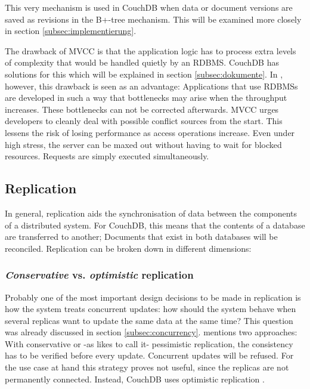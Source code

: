 This very mechanism is used in CouchDB when data or document versions are saved as revisions in the B+-tree mechanism. This will be examined more closely in section \ref{subsec:implementierung}.

The drawback of MVCC is that the application logic has to process extra levels of complexity that would be handled quietly by an RDBMS. CouchDB has solutions for this which will be explained in section \ref{subsec:dokumente}. In , however, this drawback is seen as an advantage: Applications that use RDBMSs are developed in such a way that bottlenecks may arise when the throughput increases. These bottlenecks can not be corrected afterwards. MVCC urges developers to cleanly deal with possible conflict sources from the start. This lessens the risk of losing performance as access operations increase. Even under high stress, the server can be maxed out without having to wait for blocked resources. Requests are simply executed simultaneously.

\subsection{Replication}
\label{subsec:replikation-theorie}

In general, replication aids the synchronisation of data between the components of a distributed system. For CouchDB, this means that the contents of a database are transferred to another; Documents that exist in both databases will be reconciled. Replication can be broken down in different dimensions:


\subsubsection{\textit{Conservative} vs. \textit{optimistic} replication}
\label{subsec:optimistic}

Probably one of the most important design decisions to be made in replication is how the system treats concurrent updates: how should the system behave when several replicas want to update the same data at the same time? This question was already discussed in section \ref{subsec:concurrency}.  mentions two approaches: With conservative or -as  likes to call it- pessimistic replication, the consistency has to be verified before every update. Concurrent updates will be refused. For the use case at hand this strategy proves not useful, since the replicas are not permanently connected. Instead, CouchDB uses optimistic replication .

